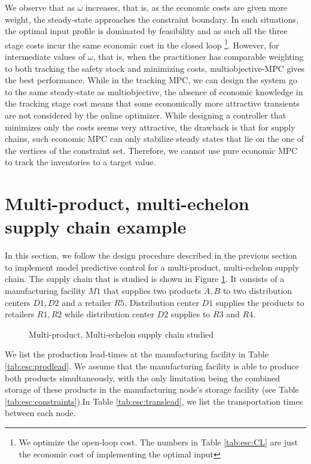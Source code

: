 We observe that as $\omega$ increases, that is, as the economic costs
are given more weight, the steady-state approaches the constraint
boundary. In such situations, the optimal input profile is dominated
by feasibility and as such all the three stage costs incur the same
economic cost in the closed loop \footnote{We optimize the open-loop
  cost. The numbers in Table \ref{tab:esc:CL} are just the economic
  cost of implementing the optimal input}. However, for intermediate values of
$\omega$, that is, when the practitioner has comparable weighting to
both tracking the safety stock and minimizing costs,
multiobjective-MPC gives the best performance. While in the tracking
MPC, we can design the system go to the same steady-state as multiobjective, the absence of
economic knowledge in the tracking stage cost means that some
economically more attractive transients are not considered by the
online optimizer. While designing a controller that minimizes only the
costs seems very attractive, the drawback is that for supply chains, such economic MPC can only stabilize steady states
that lie on the one of the vertices of the constraint set. Therefore,
we cannot use pure economic MPC to track the inventories to a target
value. 

\section{Multi-product, multi-echelon supply chain example}
\label{sec:esc:multi}
In this section, we follow the design procedure described in the
previous section to implement model predictive control for a
multi-product, multi-echelon supply chain. The supply chain that is
studied is shown in Figure \ref{fig:esc:lssc}. It consists of a
manufacturing facility $M1$ that supplies two products $A,B$ to two
distribution centers $D1,D2$ and a retailer $R5$. Distribution center
$D1$ supplies the products to retailers $R1,R2$ while distribution
center $D2$ supplies to $R3$ and $R4$. 

\begin{figure}
\centering
\scriptsize
\resizebox{0.5\textwidth}{!}{}
\caption{Multi-product, Multi-echelon supply chain studied}
\label{fig:esc:lssc}
\end{figure}

We list the production lead-times at the manufacturing facility in
Table \ref{tab:esc:prodlead}. We assume that the manufacturing facility is
able to produce both products simultaneously, with the only limitation
being the combined storage of these products in the manufacturing
node's storage facility (see Table \ref{tab:esc:constraints}).In Table \ref{tab:esc:translead}, we list the transportation times between
each node.
 
